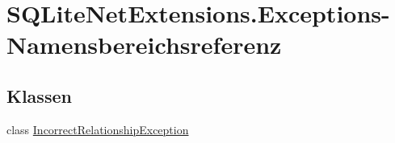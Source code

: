 \hypertarget{namespace_s_q_lite_net_extensions_1_1_exceptions}{}\section{S\+Q\+Lite\+Net\+Extensions.\+Exceptions-\/\+Namensbereichsreferenz}
\label{namespace_s_q_lite_net_extensions_1_1_exceptions}
\subsection*{Klassen}
\begin{DoxyCompactItemize}
\item 
class \mbox{\hyperlink{class_s_q_lite_net_extensions_1_1_exceptions_1_1_incorrect_relationship_exception}{Incorrect\+Relationship\+Exception}}
\end{DoxyCompactItemize}
